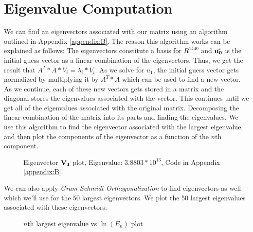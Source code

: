 \documentclass[letterpaper,12pt]{article}
\begin{document}
\section{Eigenvalue Computation}
We can find an eigenvectors associated with our matrix using an algorithm outlined in Appendix \ref{appendix:B}.
The reason this algorithm works can be explained as follows:
\newline
The eigenvectors constitute a basis for \(R^{1440}\) and \(\va{u_0}\) is the initial guess vector as a linear combination of the eigenvectors. 
Thus, we get the result that \(A^T*A*V_{i} = \lambda_{i}*V_{i}\). 
As we solve for \(u_1\), the initial guess vector gets normalized by multiplying it by \(A^T*A\) which can be used to find a new vector. 
As we continue, each of these new vectors gets stored in a matrix and the diagonal stores the eigenvalues associated with the vector. 
This continues until we get all of the eigenvalues associated with the original matrix. Decomposing the linear combination of the matrix into its parts and finding the eigenvalues.
We use this algorithm to find the eigenvector associated with the largest eigenvalue, and then plot the components of the eigenvector as a function of the \(n\)th component.
\begin{figure}[H]
    \centering
    
    \caption{Eigenvector \(\vb{V_1}\) plot, Eigenvalue: \(3.8803*10^{13}\), Code in Appendix \ref{appendix:B}}
    \label{fig:2}
\end{figure}
We can also apply \textit{Gram-Schmidt Orthogonalization} to find eigenvectors as well which we'll use for the 50 largest eigenvectors. 
We plot the 50 largest eigenvalues associated with these eigenvectors:
\begin{figure}[H]
    \centering
    
    \caption{\(n\)th largest eigenvalue vs \(\ln(E_n)\) plot}
    \label{fig:3}
\end{figure}
\end{document}
